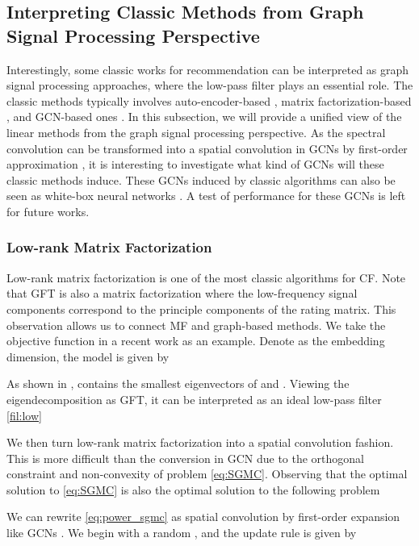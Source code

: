 \documentclass[sigconf]{acmart}
\begin{document}
\subsection{Interpreting Classic Methods from Graph Signal Processing Perspective} \label{sec:related}
Interestingly, some classic works for recommendation can be interpreted as graph signal processing approaches, where the low-pass filter plays an essential role. The classic methods typically involves auto-encoder-based \cite{ning2011slim,liang2018variational,steck2020autoencoders}, matrix factorization-based \cite{rendle2012bpr,chen2021scalable}, and GCN-based ones \cite{wang2019neural,he2020lightgcn,zhang2021cope}. In this subsection, we will provide a unified view of the linear methods from the graph signal processing perspective. As the spectral convolution can be transformed into a spatial convolution in GCNs by first-order approximation \cite{kipf2016semi}, it is interesting to investigate what kind of GCNs will these classic methods induce. These GCNs induced by classic algorithms can also be seen as white-box neural networks \cite{chan2021redunet}. A test of performance for these GCNs is left for future works.



\subsubsection{Low-rank Matrix Factorization} Low-rank matrix factorization is one of the most classic algorithms for CF. Note that GFT is also a matrix factorization where the low-frequency signal components correspond to the principle components of the rating matrix. This observation allows us to connect MF and graph-based methods. We take the objective function in a recent work \cite{chen2021scalable} as an example. Denote  as the embedding dimension, the model is given by

As shown in \cite{chen2021scalable},  contains the smallest  eigenvectors of  and . Viewing the eigendecomposition as GFT, it can be interpreted as an ideal low-pass filter \eqref{fil:low}


We then turn low-rank matrix factorization into a spatial convolution fashion. This is more difficult than the conversion in GCN \cite{kipf2016semi} due to the orthogonal constraint and non-convexity of problem \eqref{eq:SGMC}. Observing that the optimal solution  to \eqref{eq:SGMC} is also the optimal solution to the following problem 

We can rewrite \eqref{eq:power_sgmc} as spatial convolution by first-order expansion like GCNs \cite{kipf2016semi}. We begin with a random , and the update rule is given by 
\end{document}
